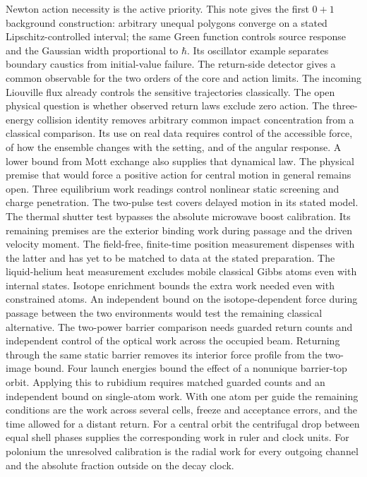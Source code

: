 \documentclass[11pt,a4paper]{article}
\begin{document}
Newton action necessity is the active priority. This note gives the
first \(0+1\) background construction: arbitrary unequal polygons
converge on a stated Lipschitz-controlled interval; the same Green
function controls source response and the Gaussian width proportional to
\(\hbar\). Its oscillator example separates boundary caustics from
initial-value failure. The return-side detector gives a common
observable for the two orders of the core and action limits. The
incoming Liouville flux already controls the sensitive trajectories
classically. The open physical question is whether observed return laws
exclude zero action. The three-energy collision identity removes
arbitrary common impact concentration from a classical comparison. Its
use on real data requires control of the accessible force, of how the
ensemble changes with the setting, and of the angular response. A lower
bound from Mott exchange also supplies that dynamical law. The physical
premise that would force a positive action for central motion in general
remains open. Three equilibrium work readings control nonlinear static
screening and charge penetration. The two-pulse test covers delayed
motion in its stated model. The thermal shutter test bypasses the
absolute microwave boost calibration. Its remaining premises are the
exterior binding work during passage and the driven velocity moment. The
field-free, finite-time position measurement dispenses with the latter
and has yet to be matched to data at the stated preparation. The
liquid-helium heat measurement excludes mobile classical Gibbs atoms
even with internal states. Isotope enrichment bounds the extra work
needed even with constrained atoms. An independent bound on the
isotope-dependent force during passage between the two environments
would test the remaining classical alternative. The two-power barrier
comparison needs guarded return counts and independent control of the
optical work across the occupied beam. Returning through the same static
barrier removes its interior force profile from the two-image bound.
Four launch energies bound the effect of a nonunique barrier-top orbit.
Applying this to rubidium requires matched guarded counts and an
independent bound on single-atom work. With one atom per guide the
remaining conditions are the work across several cells, freeze and
acceptance errors, and the time allowed for a distant return. For a
central orbit the centrifugal drop between equal shell phases supplies
the corresponding work in ruler and clock units. For polonium the
unresolved calibration is the radial work for every outgoing channel and
the absolute fraction outside on the decay clock.
\end{document}
